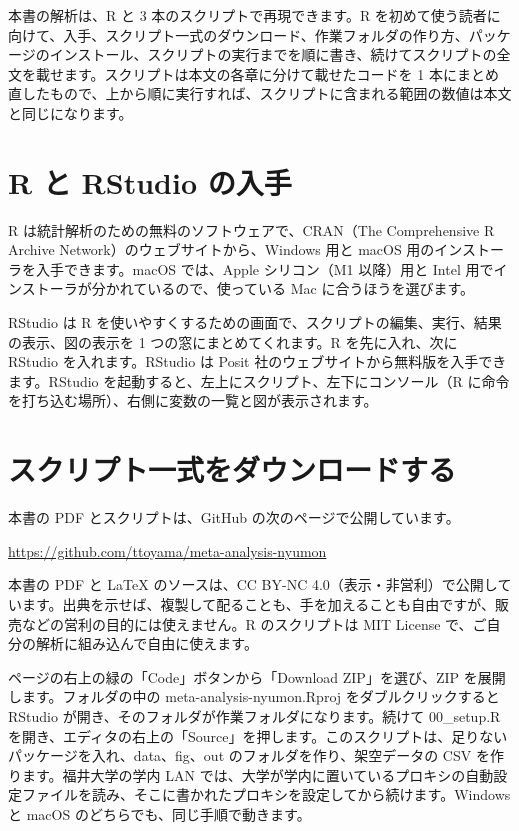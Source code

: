 \begin{chapintro}
本書の解析は、R と 3 本のスクリプトで再現できます。R を初めて使う読者に向けて、入手、スクリプト一式のダウンロード、作業フォルダの作り方、パッケージのインストール、スクリプトの実行までを順に書き、続けてスクリプトの全文を載せます。スクリプトは本文の各章に分けて載せたコードを 1 本にまとめ直したもので、上から順に実行すれば、スクリプトに含まれる範囲の数値は本文と同じになります。
\end{chapintro}

\section{R と RStudio の入手}
\label{sec:A-1}

R は統計解析のための無料のソフトウェアで、CRAN（The Comprehensive R Archive Network）のウェブサイトから、Windows 用と macOS 用のインストーラを入手できます。macOS では、Apple シリコン（M1 以降）用と Intel 用でインストーラが分かれているので、使っている Mac に合うほうを選びます。

RStudio は R を使いやすくするための画面で、スクリプトの編集、実行、結果の表示、図の表示を 1 つの窓にまとめてくれます。R を先に入れ、次に RStudio を入れます。RStudio は Posit 社のウェブサイトから無料版を入手できます。RStudio を起動すると、左上にスクリプト、左下にコンソール（R に命令を打ち込む場所）、右側に変数の一覧と図が表示されます。

\section{スクリプト一式をダウンロードする}
\label{sec:A-2}

本書の PDF とスクリプトは、GitHub の次のページで公開しています。

\begin{center}\url{https://github.com/ttoyama/meta-analysis-nyumon}\end{center}

本書の PDF と LaTeX のソースは、CC BY-NC 4.0（表示・非営利）で公開しています。出典を示せば、複製して配ることも、手を加えることも自由ですが、販売などの営利の目的には使えません。R のスクリプトは MIT License で、ご自分の解析に組み込んで自由に使えます。

ページの右上の緑の「Code」ボタンから「Download ZIP」を選び、ZIP を展開します。フォルダの中の meta-analysis-nyumon.Rproj をダブルクリックすると RStudio が開き、そのフォルダが作業フォルダになります。続けて 00\_setup.R を開き、エディタの右上の「Source」を押します。このスクリプトは、足りないパッケージを入れ、data、fig、out のフォルダを作り、架空データの CSV を作ります。福井大学の学内 LAN では、大学が学内に置いているプロキシの自動設定ファイルを読み、そこに書かれたプロキシを設定してから続けます。Windows と macOS のどちらでも、同じ手順で動きます。


